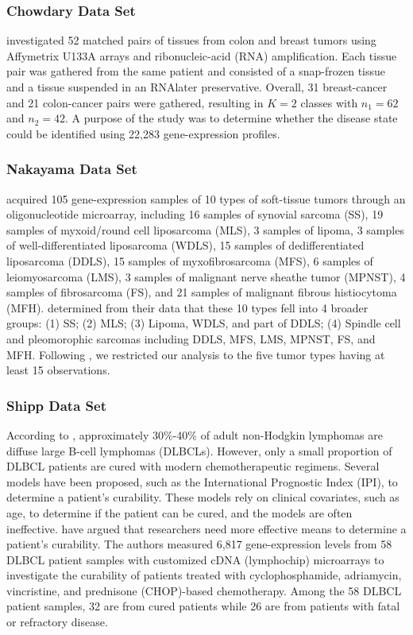 \documentclass[]{interact}\usepackage[]{graphicx}\usepackage[]{color}
\begin{document}
\subsubsection{Chowdary Data Set}

\cite{Chowdary:2006kf} investigated 52 matched pairs of tissues from colon and
breast tumors using Affymetrix U133A arrays and ribonucleic-acid (RNA)
amplification. Each tissue pair was gathered from the same patient and consisted
of a snap-frozen tissue and a tissue suspended in an RNAlater preservative.
Overall, 31 breast-cancer and 21 colon-cancer pairs were gathered, resulting in
$K = 2$ classes with $n_1 = 62$ and $n_2 = 42$. A purpose of the study was to
determine whether the disease state could be identified using 22,283
gene-expression profiles.

\subsubsection{Nakayama Data Set}

\cite{Nakayama:2007fl} acquired 105 gene-expression samples of 10 types of
soft-tissue tumors through an oligonucleotide microarray, including 16 samples
of synovial sarcoma (SS), 19 samples of myxoid/round cell liposarcoma (MLS), 3
samples of lipoma, 3 samples of well-differentiated liposarcoma (WDLS), 15
samples of dedifferentiated liposarcoma (DDLS), 15 samples of myxofibrosarcoma
(MFS), 6 samples of leiomyosarcoma (LMS), 3 samples of malignant nerve sheathe
tumor (MPNST), 4 samples of fibrosarcoma (FS), and 21 samples of malignant
fibrous histiocytoma (MFH). \cite{Nakayama:2007fl} determined from their data
that these 10 types fell into 4 broader groups: (1) SS; (2) MLS; (3) Lipoma,
WDLS, and part of DDLS; (4) Spindle cell and pleomorophic sarcomas including
DDLS, MFS, LMS, MPNST, FS, and MFH. Following \cite{Witten:2011kc}, we
restricted our analysis to the five tumor types having at least 15 observations.

\subsubsection{Shipp Data Set}

According to \cite{Shipp:2002ka}, approximately 30\%-40\% of adult non-Hodgkin
lymphomas are diffuse large B-cell lymphomas (DLBCLs). However, only a small
proportion of DLBCL patients are cured with modern chemotherapeutic regimens.
Several models have been proposed, such as the International Prognostic Index
(IPI), to determine a patient's curability. These models rely on clinical
covariates, such as age, to determine if the patient can be cured, and the
models are often ineffective. \cite{Shipp:2002ka} have argued that researchers
need more effective means to determine a patient's curability. The authors
measured 6,817 gene-expression levels from 58 DLBCL patient samples with
customized cDNA (lymphochip) microarrays to investigate the curability of
patients treated with cyclophosphamide, adriamycin, vincristine, and prednisone
(CHOP)-based chemotherapy. Among the 58 DLBCL patient samples, 32 are from cured
patients while 26 are from patients with fatal or refractory disease.
\end{document}
